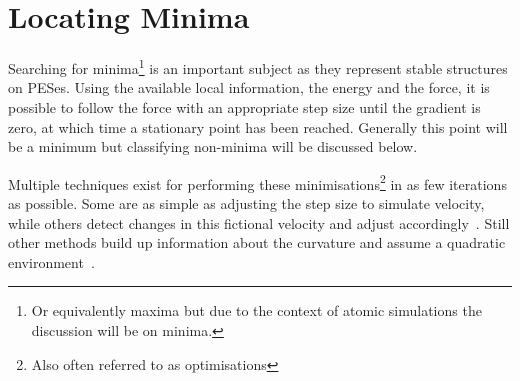 \section{Locating Minima}
\label{sec:minima}
Searching for minima\footnote{Or equivalently maxima but due to the context of atomic simulations the discussion will be on minima.} is an important subject as they represent stable structures on PESes.
Using the available local information, the energy and the force, it is possible to follow the force with an appropriate step size until the gradient is zero, at which time a stationary point has been reached.
Generally this point will be a minimum but classifying non-minima will be discussed below.

Multiple techniques exist for performing these minimisations\footnote{Also often referred to as optimisations} in as few iterations as possible.
Some are as simple as adjusting the step size to simulate velocity, while others detect changes in this fictional velocity and adjust accordingly~\cite{cg-original-1952, fire}.
Still other methods build up information about the curvature and assume a quadratic environment~\cite{lbfgs}.

